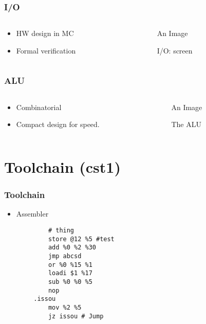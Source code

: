 \documentclass[aspectratio=169]{beamer}
\newcommand{\hw}{HW}
\begin{document}
\begin{frame}
	\frametitle{I/O}
	\begin{columns}
		\begin{column}{0.5\textwidth}
			\begin{itemize}
				\item \hw{} design in MC
				\item Formal verification
			\end{itemize}
		\end{column}
		\begin{column}{0.5\textwidth}
			\begin{figure}
				An Image
				\caption*{I/O: screen}
			\end{figure}
		\end{column}
	\end{columns}
\end{frame}

\begin{frame}
	\frametitle{ALU}
	\begin{columns}
		\begin{column}{0.5\textwidth}
			\begin{itemize}
				\item Combinatorial
				\item Compact design for speed.
			\end{itemize}
		\end{column}
		\begin{column}{0.5\textwidth}
			\begin{figure}
				An Image
				\caption*{The ALU}
			\end{figure}
		\end{column}
	\end{columns}
\end{frame}

\section{Toolchain (cst1)}
\begin{frame}[fragile]
	\frametitle{Toolchain}
	\begin{itemize}
		\item Assembler
	\end{itemize}
	\begin{verbatim}
            # thing
            store @12 %5 #test
            add %0 %2 %30
            jmp abcsd
            or %0 %15 %1
            loadi $1 %17
            sub %0 %0 %5
            nop
        .issou
            mov %2 %5
            jz issou # Jump
        \end{verbatim}
\end{frame}
\end{document}

